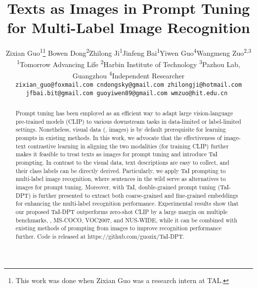 \documentclass[10pt,twocolumn,letterpaper]{article}
\begin{document}
\title{Texts as Images in Prompt Tuning for Multi-Label Image Recognition}









\author{
  {\small Zixian Guo\textsuperscript{\rm 1}\thanks{This work was done when Zixian Guo was a research intern at TAL.} \quad Bowen Dong\textsuperscript{\rm 2}\quad Zhilong Ji\textsuperscript{\rm 1}\quad Jinfeng Bai\textsuperscript{\rm 1}\quad Yiwen Guo\textsuperscript{\rm 4}\quad  Wangmeng Zuo\textsuperscript{\rm 2,3}} \\
  {\small \textsuperscript{\rm 1}Tomorrow Advancing Life \quad \textsuperscript{\rm 2}Harbin Institute of Technology \quad \textsuperscript{\rm 3}Pazhou Lab, Guangzhou \quad \textsuperscript{\rm 4}Independent Researcher}\\
  \tt{\small{zixian\_guo@foxmail.com \quad cndongsky@gmail.com \quad zhilongji@hotmail.com}} \\
  \tt{\small{jfbai.bit@gmail.com \quad guoyiwen89@gmail.com \quad wmzuo@hit.edu.cn}}
}

\maketitle







\begin{abstract}
    Prompt tuning has been employed as an efficient way to adapt large vision-language pre-trained models (\eg CLIP) to various downstream tasks in data-limited or label-limited settings. 
    Nonetheless, visual data (\eg, images) is by default prerequisite for learning prompts in existing methods.
In this work, we advocate that the effectiveness of image-text contrastive learning in aligning the two modalities (for training CLIP) further makes it feasible to treat texts as images for prompt tuning and introduce TaI prompting. 
    In contrast to the visual data, text descriptions are easy to collect, and their class labels can be directly derived.
    Particularly, we apply TaI prompting to multi-label image recognition, where sentences in the wild serve as alternatives to images for prompt tuning.
    Moreover, with TaI, double-grained prompt tuning (TaI-DPT) is further presented to extract both coarse-grained and fine-grained embeddings for enhancing the multi-label recognition performance.
    Experimental results show that our proposed TaI-DPT outperforms zero-shot CLIP by a large margin on multiple benchmarks, \eg, MS-COCO, VOC2007, and NUS-WIDE, while it can be combined with existing methods of prompting from images to improve recognition performance further.
    Code is released at https://github.com/guozix/TaI-DPT.


\end{abstract}
\end{document}
